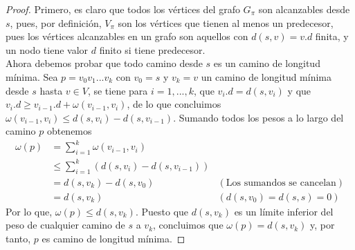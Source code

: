 \begin{proof}
	Primero, es claro que todos los vértices del grafo $G_{\pi}$ son alcanzables desde $s$, pues, por definición, $V_{\pi}$ son los vértices que tienen al menos un predecesor, pues los vértices alcanzables en un grafo son aquellos con $d(s,v) = v.d$ finita, y un nodo tiene valor $d$ finito si tiene predecesor. \\
	Ahora debemos probar que todo camino desde $s$ es un camino de longitud mínima. Sea $p=v_0v_1...v_k$ con $v_0=s$ y $v_k=v$ un camino de longitud mínima desde $s$ hasta $v\in V$, se tiene para $i=1,...,k$, que $v_i.d=d(s,v_i)$ y que $v_i.d \geq v_{i-1}.d + \omega(v_{i-1},v_i)$, de lo que concluimos $\omega(v_{i-1},v_i) \leq d(s,v_i)-d(s,v_{i-1})$. Sumando todos los pesos a lo largo del camino $p$ obtenemos
	\begin{align*}
		\omega(p) & = \sum_{i=1}^{k}\omega(v_{i-1},v_i) \\
		& \leq \sum_{i=1}^{k}(d(s,v_i)-d(s,v_{i-1})) \\
		& = d(s,v_k) - d(s,v_0) &(\textrm{Los sumandos se cancelan}) \\
		& = d(s,v_k) & (d(s,v_0)=d(s,s)=0)
	\end{align*}
	Por lo que, $\omega(p)\leq d(s,v_k)$. Puesto que $d(s,v_k)$ es un límite inferior del peso de cualquier camino de $s$ a $v_k$, concluimos que $\omega(p)= d(s,v_k)$ y, por tanto, $p$ es camino de longitud mínima.
\end{proof}

\endinput
